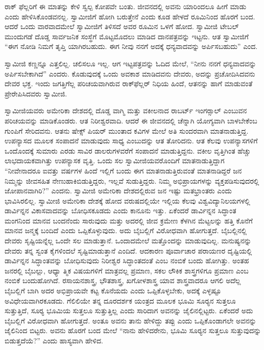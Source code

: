  ರಾಕ್ ಫೆಲ್ಲರಿಗೆ ಈ ಮಾತನ್ನು ಕೇಳಿ ಸ್ವಲ್ಪ ಕೋಪವೇ ಬಂತು. ಜೀವನದಲ್ಲಿ ಅವನು ಯಾರಿಂದಲೂ ಹೀಗೆ ಮಾಡು ಎಂದು ಹೇಳಿಸಿಕೊಂಡವನಲ್ಲ. ಸ್ವಾಮೀಜಿಗೆ ಹೋಗಿ ಬರುತ್ತೇನೆ ಎಂದು ಕೂಡ ಹೇಳದೆ ರೂಮಿನಿಂದ ಹೊರಗೆ ಬಂದ. ಆದರೆ ಒಂದು ವಾರವಾದಮೇಲೆ ಸ್ವಾಮೀಜಿಗೆ ತಿಳಿಸದೆ ಅವರ ರೂಮಿನ ಒಳಗೆ ಹೋದ. ಸ್ವಾಮೀಜಿ ಟೇಬಲ್ ಮುಂದುಗಡೆ ದೊಡ್ಡ ಸಾರ್ವಜನಿಕ ಸಂಸ್ಥೆಗೆ ಮೊಟ್ಟಮೊದಲು ಮಾಡಿದ ದಾನಪತ್ರವನ್ನು ಇಟ್ಟನು. ಆತ ಸ್ವಾಮೀಜಿಗೆ “ಈಗ ನೋಡಿ ನಿಮಗೆ ತೃಪ್ತಿ ಯಾಗಿರಬಹುದು. ಈಗ ನೀವು ನನಗೆ ಅದಕ್ಕೆ ಧನ್ಯವಾದವನ್ನು ಅರ್ಪಿಸಬಹುದು” ಎಂದ. 

 ಸ್ವಾಮೀಜಿ ಕಣ್ಣನ್ನೂ ಎತ್ತಲಿಲ್ಲ. ಚಲಿಸಲೂ ಇಲ್ಲ. ಆಗ ಇಟ್ಟಪತ್ರವನ್ನು ಓದಿದ ಮೇಲೆ, “ನೀನು ನನಗೆ ಧನ್ಯವಾದವನ್ನು ಅರ್ಪಿಸಬೇಕಾಗಿದೆ” ಎಂದರು. ಕೊಡುವುದಕ್ಕೆ ಒಂದು ಅವಕಾಶ ಮಾಡಿದವನು ದೇವರು, ಅದನ್ನು ಪ್ರಚೋದಿಸಿದವನು ದೇವರ ಭಕ್ತ. ಇಂದು ಜಗತ್ತಿಗೆಲ್ಲ ಪರಿಚಯವಾಗಿರುವ ರಾಕ್‍ಫೆಲ್ಲರ್ ನಿಧಿಯ ಹಿಂದೆ, ಆತನನ್ನು ಹಾಗೆ ಮಾಡುವಂತೆ ಪ್ರೇರೇಪಿಸಿದವರು ಸ್ವಾಮೀಜಿ. 

 ಸ್ವಾಮೀಜಿಯವರು ಅಮೇರಿಕಾ ದೇಶದಲ್ಲಿ ದೊಡ್ಡ ವಾಗ್ಮಿ ಮತ್ತು ವಕೀಲನಾದ ರಾಬರ್ಟ್ ಇಂಗರ್‍ಸಾಲ್ ಎಂಬುವನ ಪರಿಚಯವನ್ನು ಮಾಡಿಕೊಂಡರು. ಆತ ನಿರೀಶ್ವರವಾದಿ. ಆದರೆ ಈ ಜೀವನದಲ್ಲಿ ಚೆನ್ನಾಗಿ ಯೋಗ್ಯವಾಗಿ ಬಾಳಬೇಕೆಂಬ ಗುಂಪಿಗೆ ಸೇರಿದವನು. ಆತನು ಷೇಕ್ಸ್ ಪಿಯರ್ ಮುಂತಾದ ಕವಿಗಳ ಮೇಲೆ ಅತಿ ಸುಂದರವಾಗಿ ಮಾತನಾಡುತ್ತಿದ್ದ. ಉಪನ್ಯಾಸದ ಮೂಲಕ ಸಂಪಾದನೆ ಮಾಡುವುದು ಸಾಧ್ಯ ಎಂಬುದನ್ನು ಆತ ತೋರಿದನು. ಆತ ಕೆಲವು ಉಪನ್ಯಾಸಗಳಿಗೆ ಒಂದೊಂದಕ್ಕೆ ಸುಮಾರು ಎರಡು ಸಾವಿರ ಡಾಲರುಗಳವರೆಗೆ ಸಂಪಾದನೆ ಮಾಡುತ್ತಿದ್ದನು. ವಕೀಲ ವೃತ್ತಿಗಿಂತ ಹೆಚ್ಚು ಲಾಭದಾಯಕವಾಗಿತ್ತು ಉಪನ್ಯಾಸಕ ವೃತ್ತಿ. ಒಂದು ಸಲ ಸ್ವಾಮೀಜಿಯವರೊಂದಿಗೆ ಮಾತನಾಡುತ್ತಿದ್ದಾಗ “ನೀವೇನಾದರೂ ಐವತ್ತು ವರ್ಷಗಳ ಹಿಂದೆ ಇಲ್ಲಿಗೆ ಬಂದು ಈಗ ಮಾತನಾಡುತ್ತಿರುವಂತೆ ಮಾತನಾಡಿದ್ದರೆ ಜನ ನಿಮ್ಮನ್ನು ಜೀವಸಹಿತ ನೇಣುಹಾಕಿಬಿಡುತ್ತಿದ್ದರು, ಇಲ್ಲವೆ ಸುಡುತ್ತಿದ್ದರು. ನಿಮ್ಮ ಅಭಿಪ್ರಾಯಗಳನ್ನು ವ್ಯಕ್ತಪಡಿಸುವುದರಲ್ಲಿ ಜೋಪಾನವಾಗಿರಿ?” ಎಂದನು. ಸ್ವಾಮೀಜಿ ಅಮೇರಿಕಾ ದೇಶದಲ್ಲಿರುವ ಜನ ಇಷ್ಟು ಮತಭ್ರಾಂತರು ಎಂದು ಭಾವಿಸಿರಲಿಲ್ಲ. ಸ್ವಾಮೀಜಿ ಅಮೇರಿಕಾ ದೇಶಕ್ಕೆ ಹೋದ ವರುಷದಲ್ಲಿಯೇ ಇಲ್ಲಿಯ ಕೆಲವು ವಿಶ್ವವಿದ್ಯಾನಿಲಯಗಳಲ್ಲಿ ಡಾರ್ವಿನ್ನನ ವಿಕಾಸವಾದವನ್ನು ಬೋಧಿಸಕೂಡದು ಎಂದು ಕಾನೂನು ಇತ್ತು. ಏಕೆಂದರೆ ಡಾರ್ವಿನ್ನನ ಸಿದ್ಧಾಂತ ಮಂಗನಿಂದ ಮಾನವ ಬಂದನೆಂದು ಸಾರುವುದು ಮತ್ತು ಅದರಲ್ಲಿ ಜೀವ ಕ್ರಮೇಣ ಕೆಳಗಿನ ಮೆಟ್ಟಲನ್ನು ಹತ್ತಿ ಕೊನೆಗೆ ಮಾನವ ಜನ್ಮಕ್ಕೆ ಬಂದಿದೆ ಎಂದು ಒಪ್ಪಿಕೊಳ್ಳುವುದು. ಅದು ಬೈಬಲ್ಲಿಗೆ ವಿರೋಧವಾಗಿ ಹೋಗುತ್ತದೆ. ಬೈಬಲ್ಲಿನಲ್ಲಿ ದೇವರು ಸೃಷ್ಟಿಯನ್ನೆಲ್ಲ ಒಂದೇ ಸಲ ಮಾಡುತ್ತಾನೆ. ಒಂದಾದಮೇಲೆ ಮತ್ತೊಂದನ್ನು ಮಾಡುವುದಿಲ್ಲ. ಮನುಷ್ಯನನ್ನು ದೇವರು ತನ್ನ ಸ್ವಂತ ಕೈಗಳಿಂದಲೆ ಸೃಷ್ಟಿಮಾಡುತ್ತಾನೆ ಎಂದಿದೆ. ಆದಕಾರಣ ಪೂರ್ವಾಚಾರ ಪರಾಯಣರ ದೃಷ್ಟಿಯಲ್ಲಿ ಡಾರ್ವಿನ್ನನ ಸಿದ್ಧಾಂತವನ್ನು ಬೋಧಿಸುವುದು ನಿರೀಶ್ವರ ಸಿದ್ಧಾಂತದಂತೆ ಎಂಬ ನಂಬಿಕೆ ಬಂದು ಹೋಗಿತ್ತು. ಅಂತಹ ಜನರಲ್ಲಿ ಬೈಬಲ್ಲು, ಆಧ್ಯಾ ತ್ಮಿಕ ವಿಷಯಗಳಿಗೆ ಮಾತ್ರವಲ್ಲ ಪ್ರಮಾಣ, ಸಕಲ ಲೌಕಿಕ ಶಾಸ್ತ್ರಗಳಿಗೂ ಪ್ರಮಾಣ ಎಂಬ ನಂಬಿಕೆ ಬಂದುಹೋಗಿದೆ. ರಸಾಯನಶಾಸ್ತ್ರ, ಭೌತಶಾಸ್ತ್ರ, ಖಗೋಳಶಾಸ್ತ್ರ ಯಾವ ಶಾಸ್ತ್ರವಾದರೂ ಆಗಲಿ ಅದೆಲ್ಲ ಬೈಬಲ್ಲಿಗೆ ಬಾಗಿ ಅದರ ಅಭಿಪ್ರಾಯವೇ ಕಟ್ಟ ಕೊನೆಯದು ಎಂದು ಒಪ್ಪಿಕೊಳ್ಳಬೇಕು, ಅದಕ್ಕೆ ಎಳ್ಳಷ್ಟೂ ಅವಿಧೇಯವಾಗಿರಕೂಡದು. ಗೆಲಿಲಿಯೇ ತನ್ನ ದೂರದರ್ಶಕ ಯಂತ್ರದ ಮೂಲಕ ಭೂಮಿ ಸೂರ‍್ಯನ ಸುತ್ತಲೂ ಸುತ್ತುತ್ತಿದೆ, ಸೂರ‍್ಯ ಭೂಮಿಯ ಸುತ್ತಲೂ ಸುತ್ತುತ್ತಿಲ್ಲ ಎಂದು ಸಾರಿದಾಗ ಅವನನ್ನು ಜೈಲಿನಲ್ಲಿಟ್ಟರು. ಏಕೆಂದರೆ ಅದು ಬೈಬಲ್ಲಿಗೆ ವಿರೋಧವಾಗಿ ಹೋಗುತ್ತದೆ. ಅಂತೂ ಅವನು ತಾನು ಹೇಳಿದ್ದು ತಪ್ಪು ಎಂದು ಒಪ್ಪಿಕೊಂಡಾಗಲೇ ಅವನನ್ನು ಜೈಲಿನಿಂದ ಬಿಟ್ಟರು. ಅವನು ಹೊರಗೆ ಬಂದ ಮೇಲೆ “ನಾನು ಹೇಳಿದರೇನು, ಭೂಮಿ ಸೂರ‍್ಯನ ಸುತ್ತಲೂ ಸುತ್ತುವುದನ್ನು ಬಿಡುತ್ತದೆಯೆ?” ಎಂದು ಹಾಸ್ಯವಾಗಿ ಹೇಳಿದ. 

